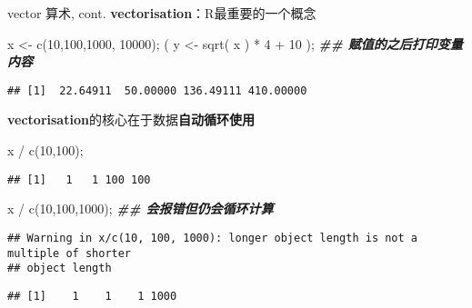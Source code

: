 \documentclass[ignorenonframetext,]{beamer}
\newenvironment{Shaded}{\begin{snugshade}}{\end{snugshade}}
\newcommand{\DecValTok}[1]{\textcolor[rgb]{0.00,0.00,0.81}{#1}}
\newcommand{\DocumentationTok}[1]{\textcolor[rgb]{0.56,0.35,0.01}{\textbf{\textit{#1}}}}
\newcommand{\FunctionTok}[1]{\textcolor[rgb]{0.00,0.00,0.00}{#1}}
\newcommand{\NormalTok}[1]{#1}
\newcommand{\OtherTok}[1]{\textcolor[rgb]{0.56,0.35,0.01}{#1}}
\newcommand{\SpecialCharTok}[1]{\textcolor[rgb]{0.00,0.00,0.00}{#1}}
\newcommand\FontSmall{\fontsize{7}{8}\selectfont}
\newcommand\FontNormal{\fontsize{10}{10}\selectfont}
\begin{document}
\begin{frame}[fragile]{vector 算术, cont.}
\protect\hypertarget{vector-ux7b97ux672f-cont.}{}
\textbf{vectorisation}：R最重要的一个概念

\FontSmall

\begin{Shaded}
\begin{Highlighting}[]
\NormalTok{x }\OtherTok{\textless{}{-}} \FunctionTok{c}\NormalTok{(}\DecValTok{10}\NormalTok{,}\DecValTok{100}\NormalTok{,}\DecValTok{1000}\NormalTok{, }\DecValTok{10000}\NormalTok{);}
\NormalTok{( y }\OtherTok{\textless{}{-}} \FunctionTok{sqrt}\NormalTok{( x  ) }\SpecialCharTok{*} \DecValTok{4} \SpecialCharTok{+} \DecValTok{10}\NormalTok{  ); }\DocumentationTok{\#\# 赋值的之后打印变量内容 }
\end{Highlighting}
\end{Shaded}

\begin{verbatim}
## [1]  22.64911  50.00000 136.49111 410.00000
\end{verbatim}

\FontNormal

\textbf{vectorisation}的核心在于数据\textbf{自动循环使用}

\FontSmall

\begin{Shaded}
\begin{Highlighting}[]
\NormalTok{x }\SpecialCharTok{/} \FunctionTok{c}\NormalTok{(}\DecValTok{10}\NormalTok{,}\DecValTok{100}\NormalTok{);}
\end{Highlighting}
\end{Shaded}

\begin{verbatim}
## [1]   1   1 100 100
\end{verbatim}

\begin{Shaded}
\begin{Highlighting}[]
\NormalTok{x }\SpecialCharTok{/} \FunctionTok{c}\NormalTok{(}\DecValTok{10}\NormalTok{,}\DecValTok{100}\NormalTok{,}\DecValTok{1000}\NormalTok{); }\DocumentationTok{\#\# 会报错但仍会循环计算}
\end{Highlighting}
\end{Shaded}

\begin{verbatim}
## Warning in x/c(10, 100, 1000): longer object length is not a multiple of shorter
## object length
\end{verbatim}

\begin{verbatim}
## [1]    1    1    1 1000
\end{verbatim}
\end{frame}
\end{document}
